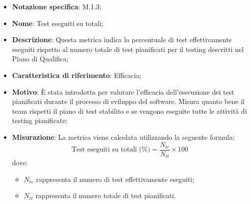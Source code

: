 \begin{itemize}
    \item \textbf{Notazione specifica}: M.1.3;
    \item \textbf{Nome}: Test eseguiti su totali;
    \item \textbf{Descrizione}: Questa metrica indica la percentuale di test effettivamente eseguiti rispetto al numero totale di test pianificati per il testing descritti nel Piano di Qualifica;
    \item \textbf{Caratteristica di riferimento}: Efficacia;
    \item \textbf{Motivo}: È stata introdotta per valutare l'efficacia dell'esecuzione dei test pianificati durante il processo di sviluppo del software. Misura quanto bene il team rispetti il piano di test stabilito e se vengono eseguite tutte le attività di testing pianificate;
    \item \textbf{Misurazione}: La metrica viene calcolata utilizzando la seguente formula:
    \[
    \text{Test eseguiti su totali (\%)} = \frac{N_{te}}{N_{tt}} \times 100
    \]
    dove:
    \begin{itemize}
        \item $N_{te}$ rappresenta il numero di test effettivamente eseguiti;
        \item $N_{tt}$ rappresenta il numero totale di test pianificati.
    \end{itemize}

\end{itemize}
